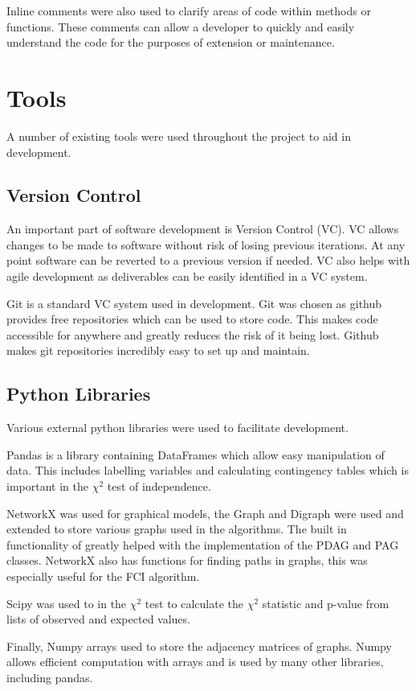 \documentclass{UoYCSproject}
\begin{document}
Inline comments were also used to clarify areas of code within methods or functions. These comments can allow a developer to quickly and easily understand the code for the purposes of extension or maintenance. 



\section{Tools}
A number of existing tools were used throughout the project to aid in development. 

\subsection{Version Control}
An important part of software development is Version Control (VC). VC allows changes to be made to software without risk of losing previous iterations. At any point software can be reverted to a previous version if needed. VC also helps with agile development as deliverables can be easily identified in a VC system.

Git is a standard VC system used in development. Git was chosen as github provides free repositories which can be used to store code. This makes code accessible for anywhere and greatly reduces the risk of it being lost. Github makes git repositories incredibly easy to set up and maintain.

\subsection{Python Libraries}
Various external python libraries were used to facilitate development.

Pandas is a library containing DataFrames which allow easy manipulation of data. This includes labelling variables and calculating contingency tables which is important in the $\chi^2$ test of independence.

NetworkX was used for graphical models, the Graph and Digraph were used and extended to store various graphs used in the algorithms. The built in functionality of greatly helped with the implementation of the PDAG and PAG classes. NetworkX also has functions for finding paths in graphs, this was especially useful for the FCI algorithm.

Scipy was used to in the $\chi^2$ test to calculate the $\chi^2$ statistic and p-value from lists of observed and expected values.

Finally, Numpy arrays used to store the adjacency matrices of graphs. Numpy allows efficient computation with arrays and is used by many other libraries, including pandas.  
\end{document}
